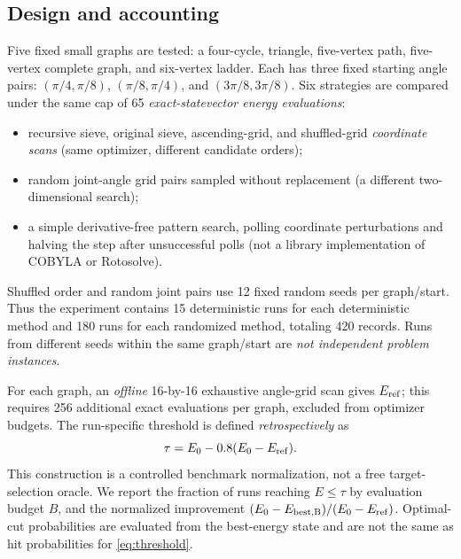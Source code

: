 \documentclass[10pt,a4paper]{article}
\begin{document}
\subsection{Design and accounting}
Five fixed small graphs are tested: a four-cycle, triangle, five-vertex path, five-vertex complete graph, and six-vertex ladder. Each has three fixed starting angle pairs: $(\pi/4,\pi/8)$, $(\pi/8,\pi/4)$, and $(3\pi/8,3\pi/8)$. Six strategies are compared under the same cap of 65 \emph{exact-statevector energy evaluations}:
\begin{itemize}
\item recursive sieve, original sieve, ascending-grid, and shuffled-grid \emph{coordinate scans} (same optimizer, different candidate orders);
\item random joint-angle grid pairs sampled without replacement (a different two-dimensional search);
\item a simple derivative-free pattern search, polling coordinate perturbations and halving the step after unsuccessful polls (not a library implementation of COBYLA or Rotosolve).
\end{itemize}
Shuffled order and random joint pairs use 12 fixed random seeds per graph/start. Thus the experiment contains 15 deterministic runs for each deterministic method and 180 runs for each randomized method, totaling 420 records. Runs from different seeds within the same graph/start are \emph{not independent problem instances}.

For each graph, an \emph{offline} 16-by-16 exhaustive angle-grid scan gives $E_{\rm ref}$; this requires 256 additional exact evaluations per graph, excluded from optimizer budgets. The run-specific threshold is defined \emph{retrospectively} as
\begin{equation}
\tau=E_0-0.8(E_0-E_{\rm ref}).\label{eq:threshold}
\end{equation}
This construction is a controlled benchmark normalization, not a free target-selection oracle. We report the fraction of runs reaching $E\le\tau$ by evaluation budget $B$, and the normalized improvement $(E_0-E_{\rm best,B})/(E_0-E_{\rm ref})$. Optimal-cut probabilities are evaluated from the best-energy state and are not the same as hit probabilities for \eqref{eq:threshold}.
\end{document}
